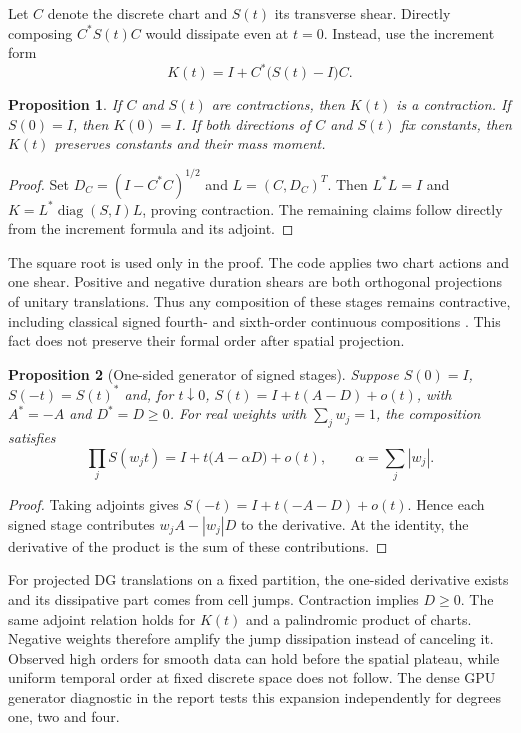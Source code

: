 \documentclass[10pt,a4paper]{article}
\newtheorem{proposition}{Proposition}
\begin{document}
Let $C$ denote the discrete chart and $S(t)$ its transverse shear.
Directly composing $C^*S(t)C$ would dissipate even at $t=0$. Instead,
use the increment form
\[
 K(t)=I+C^*\bigl(S(t)-I\bigr)C.
\]
\begin{proposition}
If $C$ and $S(t)$ are contractions, then $K(t)$ is a contraction.
If $S(0)=I$, then $K(0)=I$. If both directions of $C$ and $S(t)$
fix constants, then $K(t)$ preserves constants and their mass moment.
\end{proposition}
\begin{proof}
Set $D_C=(I-C^*C)^{1/2}$ and $L=(C,D_C)^T$. Then $L^*L=I$ and
$K=L^*\operatorname{diag}(S,I)L$, proving contraction. The remaining
claims follow directly from the increment formula and its adjoint.
\end{proof}
The square root is used only in the proof. The code applies two chart
actions and one shear. Positive and negative duration shears are both
orthogonal projections of unitary translations. Thus any composition
of these stages remains contractive, including classical signed
fourth- and sixth-order continuous compositions \cite{suzuki,yoshida}.
This fact does not preserve their formal order after spatial projection.

\begin{proposition}[One-sided generator of signed stages]
Suppose $S(0)=I$, $S(-t)=S(t)^*$ and, for $t\downarrow0$,
$S(t)=I+t(A-D)+o(t)$, with $A^*=-A$ and $D^*=D\geq0$.
For real weights with $\sum_jw_j=1$, the composition satisfies
\[
 \prod_jS(w_jt)=I+t\bigl(A-\alpha D\bigr)+o(t),
 \qquad \alpha=\sum_j|w_j|.
\]
\end{proposition}
\begin{proof}
Taking adjoints gives $S(-t)=I+t(-A-D)+o(t)$. Hence each signed
stage contributes $w_jA-|w_j|D$ to the derivative. At the identity,
the derivative of the product is the sum of these contributions.
\end{proof}
For projected DG translations on a fixed partition, the one-sided
derivative exists and its dissipative part comes from cell jumps.
Contraction implies $D\geq0$. The same adjoint relation holds for
$K(t)$ and a palindromic product of charts. Negative weights therefore
amplify the jump dissipation instead of canceling it. Observed high
orders for smooth data can hold before the spatial plateau, while
uniform temporal order at fixed discrete space does not follow.
The dense GPU generator diagnostic in the report tests this expansion
independently for degrees one, two and four.
\end{document}
